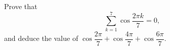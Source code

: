 Prove that
\[
\sum_{k=1}^{7}\cos\dfrac{2\pi k}{7}=0 ,
\]
and deduce the value of $\cos\dfrac{2\pi}{7}+\cos\dfrac{4\pi}{7}+\cos\dfrac{6\pi}{7}$.
